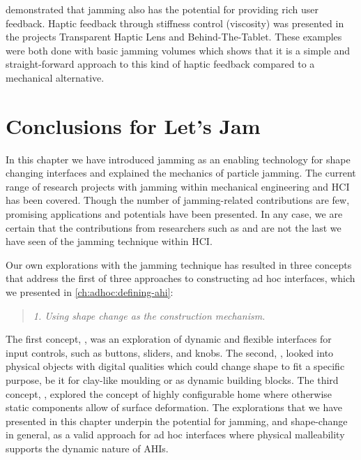 \citet{follmer2012jamming} demonstrated that jamming also has the potential for providing rich user feedback. 
Haptic feedback through stiffness control (viscosity) was presented in the projects Transparent Haptic Lens and Behind-The-Tablet.
These examples were both done with basic jamming volumes which shows that it is a simple and straight-forward approach to this kind of haptic feedback compared to a mechanical alternative.

\section{Conclusions for Let's Jam}
In this chapter we have introduced jamming as an enabling technology for shape changing interfaces and explained the mechanics of particle jamming.
The current range of research projects with jamming within mechanical engineering and HCI has been covered.
Though the number of jamming-related contributions are few, promising applications and potentials have been presented.
In any case, we are certain that the contributions from researchers such as \citet{follmer2012jamming} and \citet{matoba2012claytricsurface} are not the last we have seen of the jamming technique within HCI.

Our own explorations with the jamming technique has resulted in three concepts that address the first of three approaches to constructing ad hoc interfaces, which we presented in \autoref{ch:adhoc:defining-ahi}:
\begin{quotation}
	\emph{1. Using shape change as the construction mechanism.}
\end{quotation}
The first concept, \emph{}, was an exploration of dynamic and flexible interfaces for input controls, such as buttons, sliders, and knobs.
The second, \emph{}, looked into physical objects with digital qualities which could change shape to fit a specific purpose, be it for clay-like moulding or as dynamic building blocks.
The third concept, \emph{}, explored the concept of highly configurable home where otherwise static components allow of surface deformation.
The explorations that we have presented in this chapter underpin the potential for jamming, and shape-change in general, as a valid approach for ad hoc interfaces where physical malleability supports the dynamic nature of AHIs.
